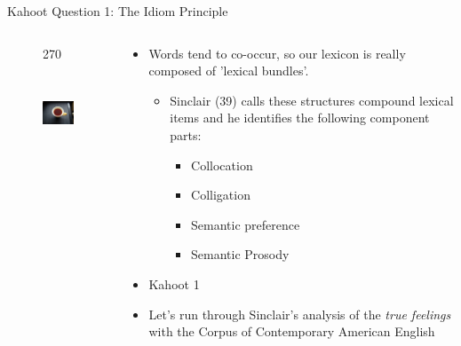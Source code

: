 \documentclass{beamer}
\begin{document}
\begin{frame}{Kahoot Question 1: The Idiom Principle}
    \begin{columns}
        \begin{column}{6cm}
            \begin{figure}
                \begin{turn}{270}
                \includegraphics[height=3cm, width=3cm]{Black-tea.jpg}
                \end{turn}
            \end{figure}
        \end{column}
        \begin{column}{6cm}
        \begin{itemize}
            \item Words tend to co-occur, so our lexicon is really composed of 'lexical bundles'.
            \begin{itemize}
                \item Sinclair (39) calls these structures compound lexical items and he identifies the following component parts:
                \begin{itemize}
                    \item Collocation
                    \item Colligation
                    \item Semantic preference
                    \item Semantic Prosody
                \end{itemize}
            \end{itemize}
        \item Kahoot 1
        \item Let's run through Sinclair's analysis of the \textit{true feelings} with the Corpus of Contemporary American English
        \end{itemize}
        \end{column}
    \end{columns}
\end{frame}
\end{document}
